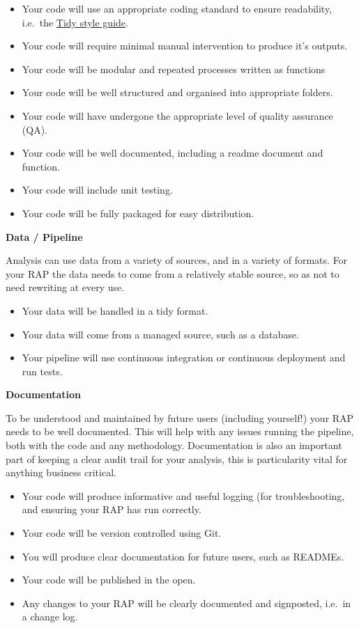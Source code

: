 \documentclass[
  letterpaper,
]{book}
\begin{document}
\begin{itemize}
\item
  Your code will use an appropriate coding standard to ensure
  readability, i.e.~the \href{https://style.tidyverse.org/}{Tidy style
  guide}.
\item
  Your code will require minimal manual intervention to produce it's
  outputs.
\item
  Your code will be modular and repeated processes written as functions
\item
  Your code will be well structured and organised into appropriate
  folders.
\item
  Your code will have undergone the appropriate level of quality
  assurance (QA).
\item
  Your code will be well documented, including a readme document and
  function.
\item
  Your code will include unit testing.
\item
  Your code will be fully packaged for easy distribution.
\end{itemize}

\textbf{Data / Pipeline}

Analysis can use data from a variety of sources, and in a variety of
formats. For your RAP the data needs to come from a relatively stable
source, so as not to need rewriting at every use.

\begin{itemize}
\item
  Your data will be handled in a tidy format.
\item
  Your data will come from a managed source, such as a database.
\item
  Your pipeline will use continuous integration or continuous deployment
  and run tests.
\end{itemize}

\textbf{Documentation}

To be understood and maintained by future users (including yourself!)
your RAP needs to be well documented. This will help with any issues
running the pipeline, both with the code and any methodology.
Documentation is also an important part of keeping a clear audit trail
for your analysis, this is particularity vital for anything business
critical.

\begin{itemize}
\item
  Your code will produce informative and useful logging (for
  troubleshooting, and ensuring your RAP has run correctly.
\item
  Your code will be version controlled using Git.
\item
  You will produce clear documentation for future users, such as
  READMEs.
\item
  Your code will be published in the open.
\item
  Any changes to your RAP will be clearly documented and signposted,
  i.e.~in a change log.
\end{itemize}
\end{document}
